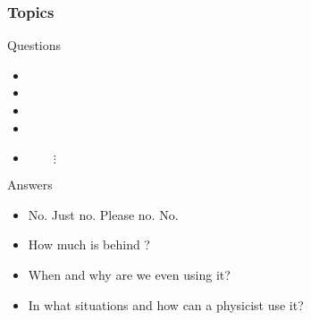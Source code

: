 \begin{frame}
\frametitle{Topics}

\begin{block}{Questions}
	\begin{itemize}
		\item {}
		\item {}
		\item {}
		\item {}
		\item[] $\qquad \vdots$
	\end{itemize}
\end{block}

\begin{alertblock}{Answers}
	\begin{itemize}
		\item No. Just no. Please no. No.
		\item How much is behind ?
		\item When and why are we even using it?
		\item In what situations and how can a physicist use it?
	\end{itemize}
\end{alertblock}

\end{frame}